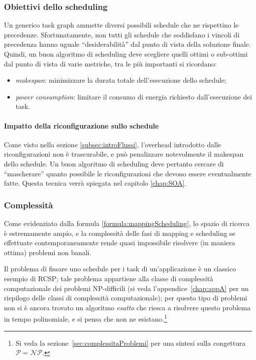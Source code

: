 \subsubsection{Obiettivi dello scheduling}
Un generico task graph ammette diversi possibili schedule che ne rispettino le 
precedenze. Sfortunatamente, non tutti gli schedule che soddisfano i vincoli di precedenza
hanno uguale ``desiderabilità'' dal punto di vista della soluzione finale. Quindi, un buon
algoritmo di scheduling deve scegliere quelli ottimi o sub-ottimi dal punto di vista di
varie metriche, tra le più importanti si ricordano:
\begin{itemize}
 \item \emph{makespan}: minimizzare la durata totale dell'esecuzione dello schedule;
 \item \emph{power consumption}: limitare il consumo di energia richiesto 
dall'esecuzione dei task.
\end{itemize}


\paragraph{Impatto della riconfigurazione sullo schedule}
Come visto nella sezione \ref{subsec:introFlussi}, l'overhead introdotto dalle riconfigurazioni
non \`e trascurabile, e pu\`o penalizzare notevolmente il makespan dello schedule.
Un buon algoritmo di scheduling deve pertanto cercare di ``mascherare'' quanto possibile le
riconfigurazioni che devono essere eventualmente fatte. Questa tecnica verr\`a spiegata nel capitolo
\ref{chap:SOA}.

\subsubsection{Complessità}
Come evidenziato dalla formula \eqref{formula:mappingScheduling}, lo spazio di ricerca è 
estremamente ampio, e la complessità delle fasi di mapping e scheduling se effettuate 
contemporaneamente rende quasi impossibile risolvere (in maniera ottima) problemi non 
banali.

Il problema di fissare uno schedule per i task di un'applicazione è un classico esempio 
di \ac{RCSP}; tale problema appartiene alla classe di complessità computazionale dei 
problemi NP-difficili (si veda l'appendice~\ref{chap:appA} per un riepilogo delle classi 
di complessità computazionale); per questo tipo di problemi non si è ancora trovato un 
algoritmo \emph{esatto} che riesca a risolvere questo problema in tempo 
polinomiale, e si pensa che non ne esistano.\footnote{Si veda la
sezione~\ref{sec:complessitaProblemi} per una sintesi sulla congettura $\mathcal{P} = 
\mathcal{NP}$.}

